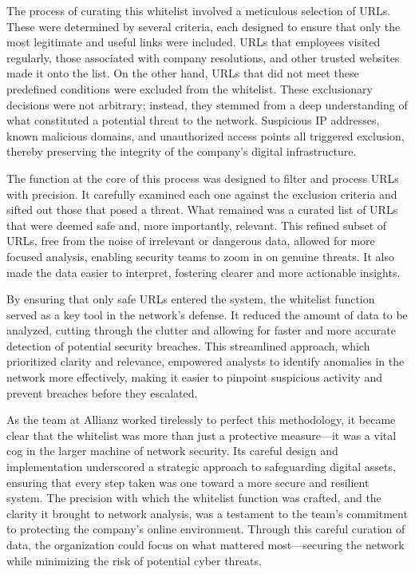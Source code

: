 The process of curating this whitelist involved a meticulous selection of URLs. These were determined by several criteria, each designed to ensure that only the most legitimate and useful links were included. URLs that employees visited regularly, those associated with company resolutions, and other trusted websites made it onto the list. On the other hand, URLs that did not meet these predefined conditions were excluded from the whitelist. These exclusionary decisions were not arbitrary; instead, they stemmed from a deep understanding of what constituted a potential threat to the network. Suspicious IP addresses, known malicious domains, and unauthorized access points all triggered exclusion, thereby preserving the integrity of the company's digital infrastructure.

The function at the core of this process was designed to filter and process URLs with precision. It carefully examined each one against the exclusion criteria and sifted out those that posed a threat. What remained was a curated list of URLs that were deemed safe and, more importantly, relevant. This refined subset of URLs, free from the noise of irrelevant or dangerous data, allowed for more focused analysis, enabling security teams to zoom in on genuine threats. It also made the data easier to interpret, fostering clearer and more actionable insights.

By ensuring that only safe URLs entered the system, the whitelist function served as a key tool in the network's defense. It reduced the amount of data to be analyzed, cutting through the clutter and allowing for faster and more accurate detection of potential security breaches. This streamlined approach, which prioritized clarity and relevance, empowered analysts to identify anomalies in the network more effectively, making it easier to pinpoint suspicious activity and prevent breaches before they escalated.

As the team at Allianz worked tirelessly to perfect this methodology, it became clear that the whitelist was more than just a protective measure—it was a vital cog in the larger machine of network security. Its careful design and implementation underscored a strategic approach to safeguarding digital assets, ensuring that every step taken was one toward a more secure and resilient system. The precision with which the whitelist function was crafted, and the clarity it brought to network analysis, was a testament to the team's commitment to protecting the company’s online environment. Through this careful curation of data, the organization could focus on what mattered most—securing the network while minimizing the risk of potential cyber threats.

